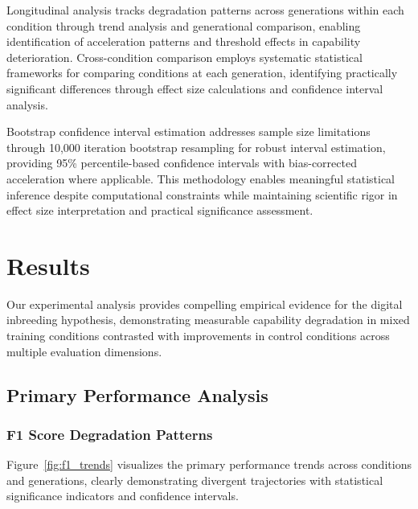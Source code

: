 \documentclass{article}
\begin{document}
Longitudinal analysis tracks degradation patterns across generations within each condition through trend analysis and generational comparison, enabling identification of acceleration patterns and threshold effects in capability deterioration. Cross-condition comparison employs systematic statistical frameworks for comparing conditions at each generation, identifying practically significant differences through effect size calculations and confidence interval analysis.

Bootstrap confidence interval estimation addresses sample size limitations through 10,000 iteration bootstrap resampling for robust interval estimation, providing 95\% percentile-based confidence intervals with bias-corrected acceleration where applicable. This methodology enables meaningful statistical inference despite computational constraints while maintaining scientific rigor in effect size interpretation and practical significance assessment.

\section{Results}

Our experimental analysis provides compelling empirical evidence for the digital inbreeding hypothesis, demonstrating measurable capability degradation in mixed training conditions contrasted with improvements in control conditions across multiple evaluation dimensions.

\subsection{Primary Performance Analysis}

\subsubsection{F1 Score Degradation Patterns}

Figure~\ref{fig:f1_trends} visualizes the primary performance trends across conditions and generations, clearly demonstrating divergent trajectories with statistical significance indicators and confidence intervals.
\end{document}
